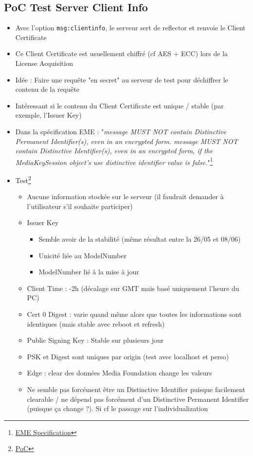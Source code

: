 \documentclass[french]{article}
\begin{document}
\subsection{PoC Test Server Client Info}
\begin{itemize}
	\item Avec l'option \texttt{msg:clientinfo}, le serveur sert de reflector et renvoie le Client Certificate
	\item Ce Client Certificate est usuellement chiffré (cf AES + ECC) lors de la License Acquisition
	\item Idée : Faire une requête "en secret" au serveur de test pour déchiffrer le contenu de la requête
	\item Intéressant si le contenu du Client Certificate est unique / stable (par exemple, l'Issuer Key)
	\item Dans la spécification EME : "\emph{message MUST NOT contain Distinctive Permanent Identifier(s), even in an encrypted form. message MUST NOT contain Distinctive Identifier(s), even in an encrypted form, if the MediaKeySession object's use distinctive identifier value is false.}"\footnote{\href{https://www.w3.org/TR/encrypted-media/\#queue-message}{EME Specification}}
	\item Test\footnote{\href{https://perso.eleves.ens-rennes.fr/people/jules.timmerman/PlayReadyPoC/}{PoC}}
	\begin{itemize}
		\item Aucune information stockée sur le serveur (il faudrait demander à l'utilisateur s'il souhaite participer)
		\item Issuer Key
		\begin{itemize}
			\item Semble avoir de la stabilité (même résultat entre la 26/05 et 08/06)
			\item Unicité liée au ModelNumber
			\item ModelNumber lié à la mise à jour
		\end{itemize}
		\item Client Time : -2h (décalage sur GMT mais basé uniquement l'heure du PC)
		\item Cert 0 Digest : varie quand même alors que toutes les informations sont identiques (mais stable avec reboot et refresh)
		\item Public Signing Key : Stable sur plusieurs jour
		\item PSK et Digest sont uniques par origin (test avec localhost et perso)
		\item Edge : clear des données Media Foundation change les valeurs
		\item Ne semble pas forcément être un Distinctive Identifier puisque facilement clearable / ne dépend pas forcément d'un Distinctive Permanent Identifier (puisque ça change ?). Si cf le passage sur l'individualization
	\end{itemize}
\end{itemize}
\end{document}
